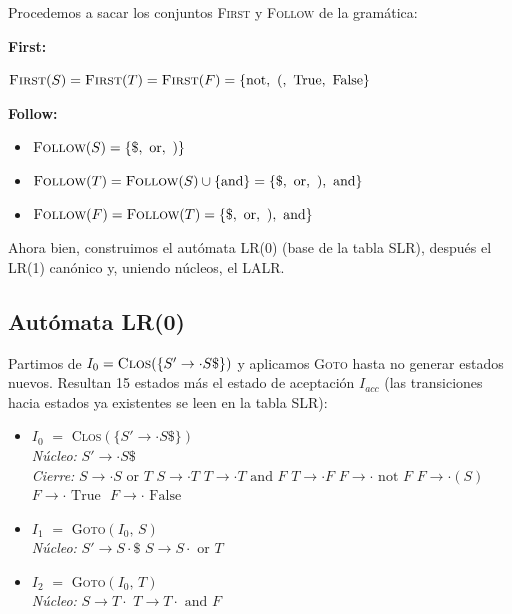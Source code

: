 \documentclass[12pt, letterpaper]{article}
\begin{document}
\begin{enumerate}
Procedemos a sacar los conjuntos \textsc{First} y \textsc{Follow} de la gramática:

\textbf{First:}

$\textsc{First}(S)=\textsc{First}(T)=\textsc{First}(F)=\{\text{not},\ (,\ \text{True},\ \text{False}\}$

\textbf{Follow:}
\begin{itemize}
    \item $\textsc{Follow}(S) = \{\$,\ \text{or},\ )\}$
    \item $\textsc{Follow}(T) = \textsc{Follow}(S) \cup \{\text{and}\} = \{\$,\ \text{or},\ ),\ \text{and}\}$
    \item $\textsc{Follow}(F) = \textsc{Follow}(T) = \{\$,\ \text{or},\ ),\ \text{and}\}$
\end{itemize}

Ahora bien, construimos el autómata LR(0) (base de la tabla SLR), después el LR(1) canónico y, uniendo núcleos, el LALR.

\subsection*{Autómata LR(0)}

Partimos de $I_0 = \textsc{Clos}(\{S' \to \cdot S\$\})$ y aplicamos \textsc{Goto} hasta no generar estados nuevos. Resultan 15 estados más el estado de aceptación $I_{acc}$ (las transiciones hacia estados ya existentes se leen en la tabla SLR):

\begin{itemize}
\item \textbf{$I_0$} $=$ \textsc{Clos}$(\{S' \to \cdot S\$\})$ \\
\textit{Núcleo:} $S' \to  \cdot S \$$ \\
\textit{Cierre:} $S \to  \cdot S \text{ or } T$ \quad $S \to  \cdot T$ \quad $T \to  \cdot T \text{ and } F$ \quad $T \to  \cdot F$ \quad $F \to  \cdot \text{ not } F$ \quad $F \to  \cdot ( S )$ \quad $F \to  \cdot \text{ True }$ \quad $F \to  \cdot \text{ False }$

\item \textbf{$I_{1}$} $=$ \textsc{Goto}$(I_{0},\,S)$ \\
\textit{Núcleo:} $S' \to S \cdot \$$ \quad $S \to S \cdot \text{ or } T$

\item \textbf{$I_{2}$} $=$ \textsc{Goto}$(I_{0},\,T)$ \\
\textit{Núcleo:} $S \to T \cdot $ \quad $T \to T \cdot \text{ and } F$


\end{itemize}
\end{enumerate}
\end{document}
